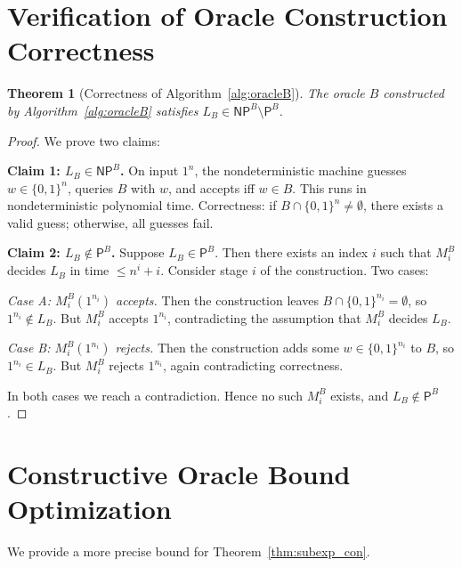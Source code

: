 \documentclass[11pt,a4paper]{article}
\theoremstyle{plain}
\newtheorem{theorem}{Theorem}[section]
\theoremstyle{definition}
\theoremstyle{remark}
\newcommand{\PP}{\mathsf{P}}
\newcommand{\NP}{\mathsf{NP}}
\newcommand{\bits}{\{0,1\}}
\begin{document}
\section{Verification of Oracle Construction Correctness}\label{app:verify}

\begin{theorem}[Correctness of Algorithm~\ref{alg:oracleB}]
The oracle $B$ constructed by Algorithm~\ref{alg:oracleB} satisfies
$L_B \in \NP^B \setminus \PP^B$.
\end{theorem}
\begin{proof}
We prove two claims:

\textbf{Claim 1: $L_B \in \NP^B$.}  On input $1^n$, the nondeterministic machine
guesses $w \in \bits^n$, queries $B$ with $w$, and accepts iff $w \in B$.  This
runs in nondeterministic polynomial time.  Correctness: if $B \cap \bits^n \neq
\emptyset$, there exists a valid guess; otherwise, all guesses fail.

\textbf{Claim 2: $L_B \notin \PP^B$.}  Suppose $L_B \in \PP^B$.  Then there
exists an index $i$ such that $M_i^B$ decides $L_B$ in time $\leq n^i + i$.
Consider stage $i$ of the construction.  Two cases:

\emph{Case A: $M_i^B(1^{n_i})$ accepts.}  Then the construction leaves
$B \cap \bits^{n_i} = \emptyset$, so $1^{n_i} \notin L_B$.  But $M_i^B$ accepts
$1^{n_i}$, contradicting the assumption that $M_i^B$ decides $L_B$.

\emph{Case B: $M_i^B(1^{n_i})$ rejects.}  Then the construction adds some
$w \in \bits^{n_i}$ to $B$, so $1^{n_i} \in L_B$.  But $M_i^B$ rejects
$1^{n_i}$, again contradicting correctness.

In both cases we reach a contradiction.  Hence no such $M_i^B$ exists,
and $L_B \notin \PP^B$.
\end{proof}

\section{Constructive Oracle Bound Optimization}\label{app:boundopt}

We provide a more precise bound for Theorem~\ref{thm:subexp_con}.
\end{document}
